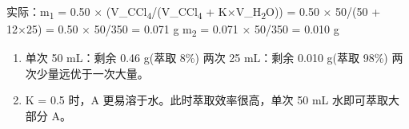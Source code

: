 实际：m\textsubscript{1} = 0.50 × (V\_CCl\textsubscript{4}/(V\_CCl\textsubscript{4} + K×V\_H\textsubscript{2}O)) = 0.50 × 50/(50 + 12×25) = 0.50 × 50/350 = 0.071 g
m\textsubscript{2} = 0.071 × 50/350 = 0.010 g

\begin{enumerate}
\def\labelenumi{(\alph{enumi})}
\setcounter{enumi}{2}
\item
  单次 50 mL：剩余 0.46 g(萃取 8\%)
  两次 25 mL：剩余 0.010 g(萃取 98\%)
  两次少量远优于一次大量。
\item
  K = 0.5 时，A 更易溶于水。此时萃取效率很高，单次 50 mL 水即可萃取大部分 A。
\end{enumerate}
